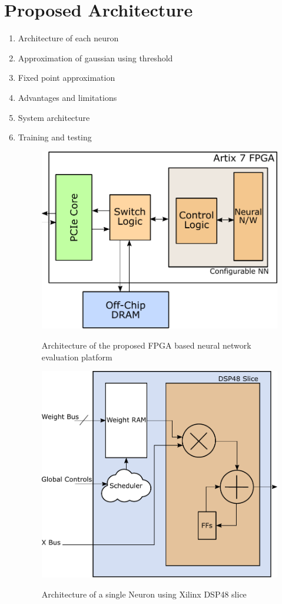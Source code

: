 \section{Proposed Architecture}
\label{sec_arch}

\begin{enumerate}
\item Architecture of each neuron
\item Approximation of gaussian using threshold
\item Fixed point approximation
\item Advantages and limitations
\item System architecture
\item Training and testing

\begin{figure}[t]
\centering
   \includegraphics[height=0.7\columnwidth]{Figures/systemarch.pdf}
   \label{fig:sysArch}
   \caption{Architecture of the proposed FPGA based neural network evaluation platform}
\end{figure}

\begin{figure}[t]
\centering
   \includegraphics[height=0.7\columnwidth]{Figures/neuron.pdf}
   \label{fig:neuron}
   \caption{Architecture of a single Neuron using Xilinx DSP48 slice}
\end{figure}


\end{enumerate}

